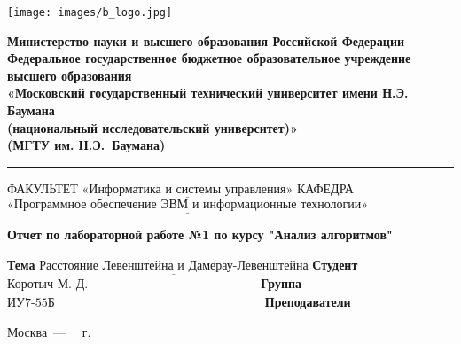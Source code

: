 \documentclass[a4paper,14pt, unknownkeysallowed]{extreport}
\begin{document}
\begin{titlepage}
	\fontsize{12pt}{12pt}\selectfont
	\noindent \begin{minipage}{0.15\textwidth}
		\texttt{[image: images/b\_logo.jpg]}
	\end{minipage}
	\noindent\begin{minipage}{0.9\textwidth}\centering
		\textbf{Министерство науки и высшего образования Российской Федерации}\\
		\textbf{Федеральное государственное бюджетное образовательное учреждение высшего образования}\\
		\textbf{«Московский государственный технический университет имени Н.Э. Баумана}\\
		\textbf{(национальный исследовательский университет)»}\\
		\textbf{(МГТУ им. Н.Э.~Баумана)}
	\end{minipage}
	
	\noindent\rule{18cm}{3pt}
	\newline\newline
	\noindent ФАКУЛЬТЕТ $\underline{\text{«Информатика и системы управления»}}$ \newline\newline
	\noindent КАФЕДРА $\underline{\text{«Программное обеспечение ЭВМ и информационные технологии»}}$\newline\newline\newline\newline\newline\newline\newline
	
	
	\begin{center}
		\Large\textbf{Отчет по лабораторной работе №1 по курсу "Анализ алгоритмов"}\newline
	\end{center}
	
	\noindent\textbf{Тема} $\underline{\text{Расстояние Левенштейна и Дамерау-Левенштейна}}$\newline\newline\newline
	\noindent\textbf{Студент} $\underline{\text{Коротыч М. Д.~~~~~~~~~~~~~~~~~~~~~~~~~~~~~~~~~~~~~~~~~}}$\newline\newline
	\noindent\textbf{Группа} $\underline{\text{ИУ7-55Б~~~~~~~~~~~~~~~~~~~~~~~~~~~~~~~~~~~~~~~~~~~~~~~~~~}}$\newline\newline
	\noindent\textbf{Преподаватели} $\underline{\text{~~~~~~~~~~~~~~~~~~~~}}$\newline
	
	\begin{center}
		\vfill
		Москва~---~\the\year
		~г.
	\end{center}
 \restoregeometry
\end{titlepage}
\end{document}
